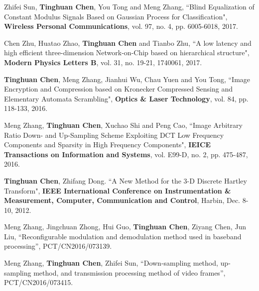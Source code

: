 \begin{cventries}
\begin{cvitems}
{\item {Zhifei Sun, \textbf{Tinghuan Chen}, You Tong and Meng Zhang, ``Blind Equalization of Constant Modulus Signals Based on Gaussian Process for Classification", \textbf{Wireless Personal Communications}, vol. 97, no. 4, pp. 6005-6018, 2017.}

\item {Chen Zhu, Huatao Zhao, \textbf{Tinghuan Chen} and Tianbo Zhu, ``A low latency and high efficient three-dimension Network-on-Chip based on hierarchical structure", \textbf{Modern Physics Letters B}, vol. 31, no. 19-21, 1740061, 2017.}

\item {\textbf{Tinghuan Chen}, Meng Zhang, Jianhui Wu, Chau Yuen and You Tong, ``Image Encryption and Compression based on Kronecker Compressed Sensing and Elementary Automata Scrambling", \textbf{Optics \& Laser Technology}, vol. 84, pp. 118-133, 2016.}

\item {Meng Zhang, \textbf{Tinghuan Chen}, Xuchao Shi and Peng Cao, ``Image Arbitrary Ratio Down- and Up-Sampling Scheme Exploiting DCT Low Frequency Components and Sparsity in High Frequency Components", \textbf{IEICE Transactions on Information and Systems}, vol. E99-D, no. 2, pp. 475-487, 2016.}


\item {\textbf{Tinghuan Chen}, Zhifang Dong. ``A New Method for the 3-D Discrete Hartley Transform", \textbf{IEEE International Conference on Instrumentation \& Measurement, Computer, Communication and Control}, Harbin, Dec. 8-10, 2012.}

}

\end{cvitems}

\end{cventries}




\begin{cventries}


\begin{cvitems}

\footnotesize{

\item{Meng Zhang, Jingchuan Zhong, Hui Guo, \textbf{Tinghuan Chen}, Ziyang Chen, Jun Liu, ``Reconfigurable modulation and demodulation method used in baseband processing'', PCT/CN2016/073139.}

\item{Meng Zhang, \textbf{Tinghuan Chen}, Zhifei Sun, ``Down-sampling method, up-sampling method, and transmission processing method of video frames'', PCT/CN2016/073415.}

}

\end{cvitems}

\end{cventries}